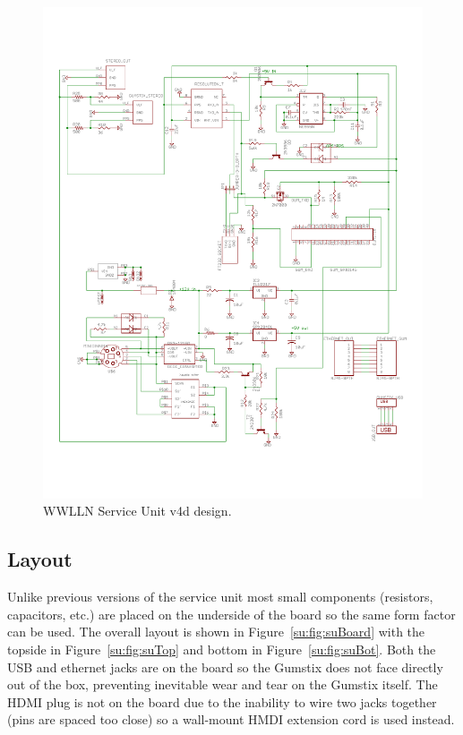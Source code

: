 \begin{figure}[ht!]
   \centering
   \includegraphics[scale=.75]{Appendix/Figures/wwlln_SU_v4_Schematic.pdf} 
   \caption{WWLLN Service Unit v4d design.}
   \label{su:fig:suSchematic}
\end{figure}

\subsection{Layout}

Unlike previous versions of the service unit most small components (resistors, capacitors, etc.) are placed on the underside of the board so the same form factor can be used.
The overall layout is shown in Figure~\ref{su:fig:suBoard} with the topside in Figure~\ref{su:fig:suTop} and bottom in Figure~\ref{su:fig:suBot}.
Both the USB and ethernet jacks are on the board so the Gumstix does not face directly out of the box, preventing inevitable wear and tear on the Gumstix itself.
The HDMI plug is not on the board due to the inability to wire two jacks together (pins are spaced too close) so a wall-mount HMDI extension cord is used instead.

